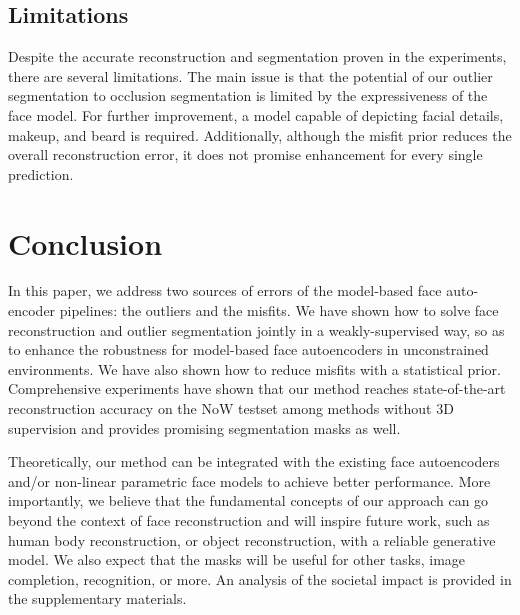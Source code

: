 \documentclass[10pt,twocolumn,letterpaper]{article}
\begin{document}
\subsection{Limitations}

Despite the accurate reconstruction and segmentation proven in the experiments, there are several limitations.
The main issue is that the potential of our outlier segmentation to occlusion segmentation is limited by the expressiveness of the face model. For further improvement, a model capable of depicting facial details, makeup, and beard is required.
Additionally, although the misfit prior reduces the overall reconstruction error, it does not promise enhancement for every single prediction.




\section{Conclusion}

In this paper, we address two sources of errors of the model-based face auto-encoder pipelines: the outliers and the misfits. We have shown how to solve face reconstruction and outlier segmentation jointly in a weakly-supervised way, so as to enhance the robustness for model-based face autoencoders in unconstrained environments. We have also shown how to reduce misfits with a statistical prior. Comprehensive experiments have shown that our method reaches state-of-the-art reconstruction accuracy on the NoW testset among methods without 3D supervision and provides promising segmentation masks as well.

Theoretically, our method can be integrated with the existing face autoencoders and/or non-linear parametric face models to achieve better performance. More importantly, we believe that the fundamental concepts of our approach can go beyond the context of face reconstruction and will inspire future work, such as human body reconstruction, or object reconstruction, with a reliable generative model.
We also expect that the masks will be useful for other tasks, \eg image completion, recognition, or more.
An analysis of the societal impact is provided in the supplementary materials.






{\small


}






\clearpage
\appendix
\end{document}
